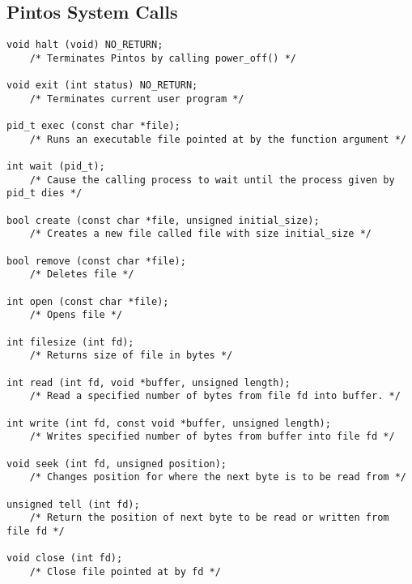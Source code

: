 \documentclass[11pt, letterpaper]{article}
\begin{document}
\pagebreak
\begin{appendices}

\section{Pintos System Calls}
\begin{lstlisting}[frame=single,basicstyle=\footnotesize]
void halt (void) NO_RETURN;
	/* Terminates Pintos by calling power_off() */
	
void exit (int status) NO_RETURN;
	/* Terminates current user program */

pid_t exec (const char *file);
	/* Runs an executable file pointed at by the function argument */

int wait (pid_t);
	/* Cause the calling process to wait until the process given by pid_t dies */

bool create (const char *file, unsigned initial_size);
	/* Creates a new file called file with size initial_size */

bool remove (const char *file);
	/* Deletes file */

int open (const char *file);
	/* Opens file */

int filesize (int fd);
	/* Returns size of file in bytes */

int read (int fd, void *buffer, unsigned length);
	/* Read a specified number of bytes from file fd into buffer. */

int write (int fd, const void *buffer, unsigned length);
	/* Writes specified number of bytes from buffer into file fd */

void seek (int fd, unsigned position);
	/* Changes position for where the next byte is to be read from */

unsigned tell (int fd);
	/* Return the position of next byte to be read or written from file fd */

void close (int fd);
	/* Close file pointed at by fd */

\end{lstlisting}

\pagebreak

%

\end{appendices}
\end{document}
